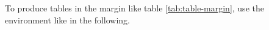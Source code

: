 \documentclass[
	raggedright,
	twoside,
	12pt,
	colorful,
]{tufte-style-article}
\begin{document}

To produce tables in the margin like table \ref{tab:table-margin}, use the  environment like in the following.
\end{document}
